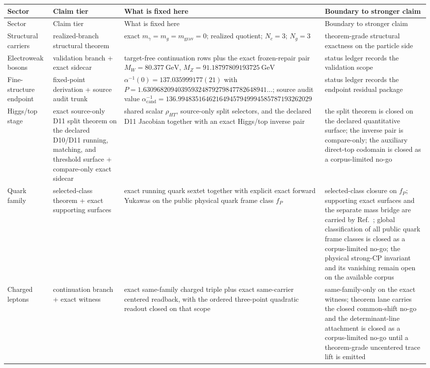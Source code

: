 \scriptsize
\setlength{\tabcolsep}{2pt}
\begin{longtable}{@{}>{\raggedright\arraybackslash}p{}>{\raggedright\arraybackslash}p{}>{\raggedright\arraybackslash}p{}>{\raggedright\arraybackslash}p{}@{}}
\toprule
Sector & Claim tier & What is fixed here & Boundary to stronger claim \\
\midrule
\endfirsthead
\toprule
Sector & Claim tier & What is fixed here & Boundary to stronger claim \\
\midrule
\endhead
\bottomrule
\endfoot
Structural carriers & realized-branch structural theorem & exact \(m_\gamma=m_g=m_{\mathrm{grav}}=0\); realized quotient; \(N_c=3\); \(N_g=3\) & theorem-grade structural exactness on the particle side \\
Electroweak bosons & validation branch + exact sidecar & target-free continuation rows plus the exact frozen-repair pair \(M_W=80.377~\mathrm{GeV}\), \(M_Z=91.18797809193725~\mathrm{GeV}\) & status ledger records the validation scope \\
Fine-structure endpoint & fixed-point derivation + source audit trunk & \(\alpha^{-1}(0)=137.035999177(21)\) with \(P=1.630968209403959324879279847782648941\ldots\); source audit value \(\alpha_{\mathrm{cand}}^{-1}=136.994835164621649457949994585787193262029\) & status ledger records the endpoint residual package \\
Higgs/top stage & exact source-only D11 split theorem on the declared D10/D11 running, matching, and threshold surface + compare-only exact sidecar & shared scalar \(\rho_{HT}\), source-only split selectors, and the declared D11 Jacobian together with an exact Higgs/top inverse pair & the split theorem is closed on the declared quantitative surface; the inverse pair is compare-only; the auxiliary direct-top codomain is closed as a corpus-limited no-go \\
Quark family & selected-class theorem + exact supporting surfaces & exact running quark sextet together with explicit exact forward Yukawas on the public physical quark frame class \(f_P\) & selected-class closure on \(f_P\); supporting exact surfaces and the separate mass bridge are carried by Ref.~\cite{ophparticles}; global classification of all public quark frame classes is closed as a corpus-limited no-go; the physical strong-CP invariant and its vanishing remain open on the available corpus \\
Charged leptons & continuation branch + exact witness & exact same-family charged triple plus exact same-carrier centered readback, with the ordered three-point quadratic readout closed on that scope & same-family-only on the exact witness; theorem lane carries the closed common-shift no-go and the determinant-line attachment is closed as a corpus-limited no-go until a theorem-grade uncentered trace lift is emitted \\

\end{longtable}
